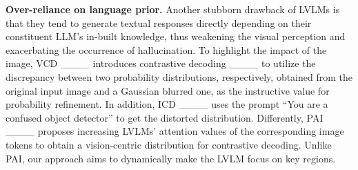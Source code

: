 \textbf{Over-reliance on language prior.}
Another stubborn drawback of LVLMs is that they tend to generate textual responses directly depending on their constituent LLM's in-built knowledge, thus weakening the visual perception and exacerbating the occurrence of hallucination.
To highlight the impact of the image, VCD ____ introduces contrastive decoding ____ to utilize the discrepancy between two probability distributions, respectively, obtained from the original input image and a Gaussian blurred one, as the instructive value for probability refinement. In addition, ICD ____ uses the prompt ``You are a confused object detector'' to get the distorted distribution. Differently, PAI ____ proposes increasing LVLMs' attention values of the corresponding image tokens to obtain a vision-centric distribution for contrastive decoding. Unlike PAI, our approach aims to dynamically make the LVLM focus on key regions.